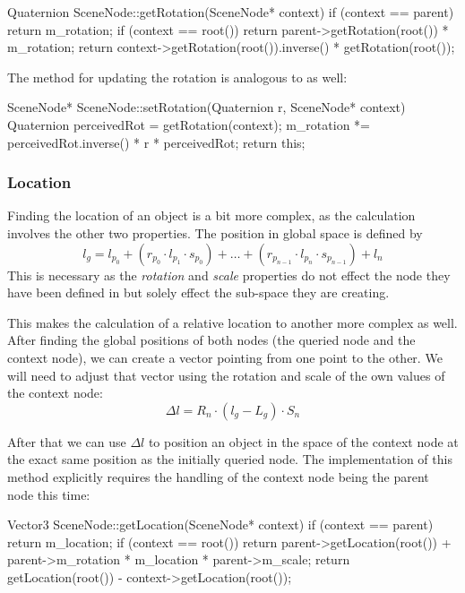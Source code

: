 			\begin{code}[4]
				Quaternion SceneNode::getRotation(SceneNode* context) {
				    if (context == parent) {
				        return m_rotation;
				    }
				    if (context == root()) {
				        return parent->getRotation(root()) * m_rotation;
				    }
				    return context->getRotation(root()).inverse() *
			            getRotation(root());
				}
			\end{code}

			The method for updating the rotation is analogous to  as well:

			\begin{code}[4]
				SceneNode* SceneNode::setRotation(Quaternion r, SceneNode* context) {
				    Quaternion perceivedRot = getRotation(context);
				    m_rotation *= perceivedRot.inverse() * r * perceivedRot;
				    return this;
				}
			\end{code}

		\subsubsection{Location}

		Finding the location of an object is a bit more complex, as the calculation involves the other two properties. The position in global space is defined by \[l_g = l_{p_0} + (r_{p_0} \cdot l_{p_1} \cdot s_{p_0}) + \ldots + (r_{p_{n-1}} \cdot l_{p_n} \cdot s_{p_{n-1}}) + l_n\] This is necessary as the \emph{rotation} and \emph{scale} properties do not effect the node they have been defined in but solely effect the sub-space they are creating.

			This makes the calculation of a relative location to another more complex as well. After finding the global positions of both nodes (the queried node and the context node), we can create a vector pointing from one point to the other. We will need to adjust that vector using the rotation and scale of the own values of the context node: \[\Delta l = R_n \cdot (l_g - L_g) \cdot S_n\]

			After that we can use $\Delta l$ to position an object in the space of the context node at the exact same position as the initially queried node. The implementation of this method explicitly requires the handling of the context node being the parent node this time:

			\begin{code}[4]
				Vector3 SceneNode::getLocation(SceneNode* context) {
				    if (context == parent) {
				        return m_location;
				    }
				    if (context == root()) {
				        return parent->getLocation(root()) +
				               parent->m_rotation * m_location * parent->m_scale;
				    }
				    return getLocation(root()) - context->getLocation(root());
				}
			\end{code}


